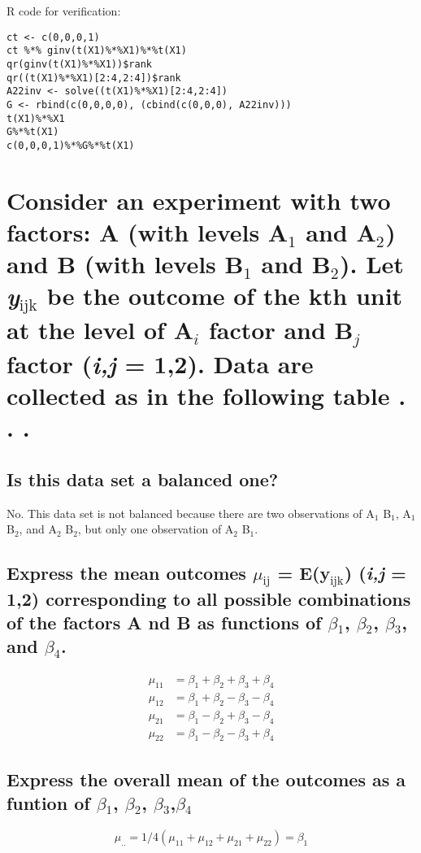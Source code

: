 \documentclass[11pt]{article}
\begin{document}
R code for verification:

\begin{verbatim}
ct <- c(0,0,0,1)
ct %*% ginv(t(X1)%*%X1)%*%t(X1)
qr(ginv(t(X1)%*%X1))$rank
qr((t(X1)%*%X1)[2:4,2:4])$rank
A22inv <- solve((t(X1)%*%X1)[2:4,2:4])
G <- rbind(c(0,0,0,0), (cbind(c(0,0,0), A22inv)))
t(X1)%*%X1
G%*%t(X1)
c(0,0,0,1)%*%G%*%t(X1)
\end{verbatim}
 
\newpage
\section{Consider an experiment with two factors: A (with levels A$_1$ and A$_2$) and B (with levels B$_1$ and B$_2$). Let \emph{y$_{\mathrm{ijk}}$} be the outcome of the kth unit at the level of A$_i$ factor and B$_j$ factor (\emph{i,j} = 1,2). Data are collected as in the following table . . .}
\label{sec-2}
\subsection{Is this data set a balanced one?}
\label{sec-2-1}


No. This data set is not balanced because there are two observations
of A$_1$ B$_1$, A$_1$ B$_2$, and A$_2$ B$_2$, but only one observation of A$_2$ B$_1$.
\subsection{Express the mean outcomes $\mu$$_{\mathrm{ij}}$ = E(y$_{\mathrm{ijk}}$) (\emph{i,j} = 1,2) corresponding to all possible combinations of the factors A nd B as functions of $\beta$$_1$, $\beta$$_2$, $\beta$$_3$, and $\beta$$_4$.}
\label{sec-2-2}


\begin{align*}
\mu_{11} &= \beta_1 + \beta_2 + \beta_3 + \beta_4\\
\mu_{12} &= \beta_1 + \beta_2 - \beta_3 - \beta_4\\
\mu_{21} &= \beta_1 - \beta_2 + \beta_3 - \beta_4\\
\mu_{22} &= \beta_1 - \beta_2 - \beta_3 + \beta_4
\end{align*}
\subsection{Express the overall mean of the outcomes as a funtion of $\beta$$_1$, $\beta$$_2$, $\beta$$_3$,$\beta$$_4$}
\label{sec-2-3}


$$\mu_{..}=1/4(\mu_{11}+\mu_{12}+\mu_{21}+\mu_{22}) = \beta_1$$
\end{document}
